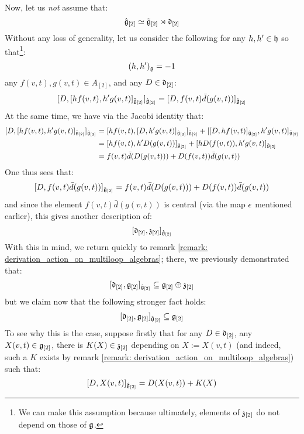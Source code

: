 \begin{remark}
                Now, let us \textit{not} assume that:
                    $$\hat{\mathfrak{g}}_{[2]} \simeq \tilde{\mathfrak{g}}_{[2]}\rtimes \mathfrak{d}_{[2]}$$
                Without any loss of generality, let us consider the following for any $h, h' \in \mathfrak{h}$ so that\footnote{We can make this assumption because ultimately, elements of $\mathfrak{z}_{[2]}$ do not depend on those of $\mathfrak{g}$.}:
                    $$(h, h')_{\mathfrak{g}} = -1$$
                any $f(v, t), g(v, t) \in A_{[2]}$, and any $D \in \mathfrak{d}_{[2]}$:
                    $$[ D, [h f(v, t), h' g(v, t)]_{\tilde{\mathfrak{g}}_{[2]}} ]_{\hat{\mathfrak{g}}_{[2]}} = [ D, f(v, t) \bar{d}( g(v, t) ) ]_{\hat{\mathfrak{g}}_{[2]}}$$
                At the same time, we have via the Jacobi identity that:
                    $$
                        \begin{aligned}
                            [ D, [h f(v, t), h' g(v, t)]_{\tilde{\g}_{[2]}} ]_{\hat{\g}_{[2]}} & = [ h f(v, t), [D, h' g(v, t)]_{\hat{\g}_{[2]}} ]_{\tilde{\g}_{[2]}} + [ [D, h f(v, t)]_{\hat{\g}_{[2]}}, h' g(v, t) ]_{\tilde{\g}_{[2]}}
                            \\
                            & = [ h f(v, t), h' D( g(v, t) ) ]_{\tilde{\g}_{[2]}} + [ h D( f(v, t) ), h' g(v, t) ]_{\tilde{\g}_{[2]}}
                            \\
                            & = f(v, t) \bar{d}( D( g(v, t) ) ) + D( f(v, t) ) \bar{d}(g(v, t))
                        \end{aligned}
                    $$
                One thus sees that:
                    $$[ D, f(v, t) \bar{d}( g(v, t) ) ]_{\hat{\mathfrak{g}}_{[2]}} = f(v, t) \bar{d}( D( g(v, t) ) ) + D( f(v, t) ) \bar{d}(g(v, t))$$
                and since the element $f(v, t) \bar{d}( g(v, t) )$ is central (via the map $\epsilon$ mentioned earlier), this gives another description of:
                    $$[ \mathfrak{d}_{[2]}, \mathfrak{z}_{[2]} ]_{\hat{\mathfrak{g}}_{[2]}}$$
                With this in mind, we return quickly to remark \ref{remark: derivation_action_on_multiloop_algebras}; there, we previously demonstrated that:
                    $$[ \mathfrak{d}_{[2]}, \mathfrak{g}_{[2]} ]_{\hat{\mathfrak{g}}_{[2]}} \subseteq \mathfrak{g}_{[2]} \oplus \mathfrak{z}_{[2]}$$
                but we claim now that the following stronger fact holds:
                    $$[ \mathfrak{d}_{[2]}, \mathfrak{g}_{[2]} ]_{\hat{\mathfrak{g}}_{[2]}} \subseteq \mathfrak{g}_{[2]}$$
                To see why this is the case, suppose firstly that for any $D \in \mathfrak{d}_{[2]}$, any $X(v, t) \in \mathfrak{g}_{[2]}$, there is $K(X) \in \mathfrak{z}_{[2]}$ depending on $X := X(v, t)$ (and indeed, such a $K$ exists by remark \ref{remark: derivation_action_on_multiloop_algebras}) such that:
                    $$[ D, X(v, t) ]_{\hat{\mathfrak{g}}_{[2]}} = D( X(v, t) ) + K(X)$$

\end{remark}
